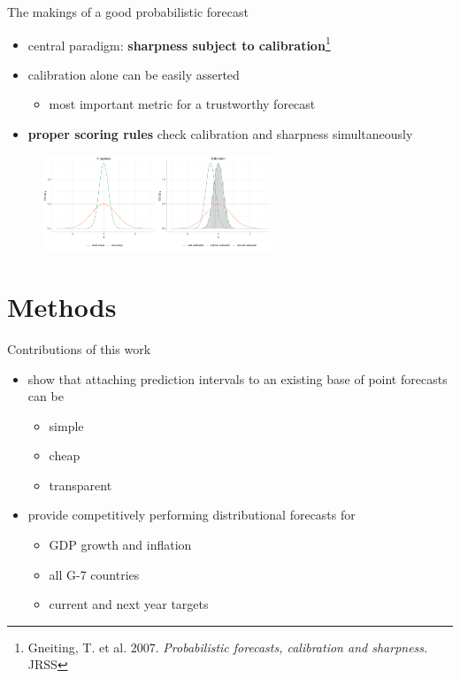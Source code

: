 \documentclass[en]{sdqbeamer}
\begin{document}
\begin{frame}[t]{The makings of a good probabilistic forecast}
\vspace*{-0.25cm}
\begin{itemize}
\item central paradigm: \textbf{sharpness subject to calibration}\footnote{Gneiting, T. et al. 2007. \textit{Probabilistic forecasts, calibration and sharpness.} JRSS}
\item calibration alone can be easily asserted
\begin{itemize}
\item most important metric for a trustworthy forecast
\end{itemize}
\item \textbf{proper scoring rules} check calibration and sharpness simultaneously
\end{itemize}
\begin{figure}
        \centering
        \includegraphics[width=0.61\textwidth]{figures_svr/sharp_calib.pdf} 
    \end{figure}
\end{frame}



\section{Methods}
\begin{frame}[t]{Contributions of this work}
\begin{itemize}
    \item show that attaching prediction intervals to an existing base of point forecasts can be 
    \begin{itemize} 
    \item simple
    \item cheap
    \item transparent
    \end{itemize}   
    \item provide competitively performing distributional forecasts for 
    \begin{itemize}
    \item  GDP growth and inflation
    \item  all G-7 countries
    \item  current and next year targets
    \end{itemize}
\end{itemize}
\end{frame}
\end{document}
